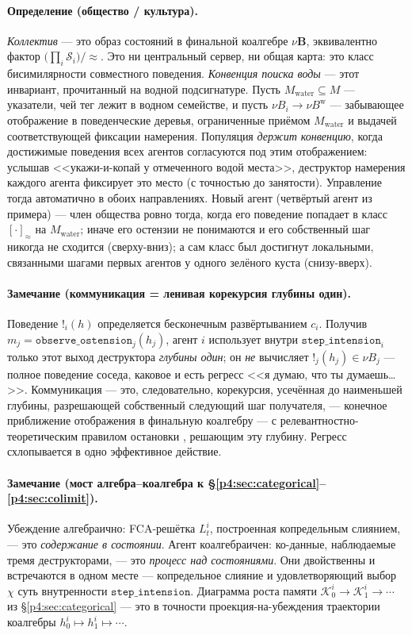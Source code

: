 \documentclass{article}
\newcommand{\method}[1]{\texttt{#1}}
\begin{document}
\paragraph{Определение (общество / культура).}
\emph{Коллектив} --- это образ состояний в финальной коалгебре
$\nu\mathbf{B}$, эквивалентно фактор
$\big(\prod_i\mathcal{S}_i\big)/\!\approx$. Это ни центральный сервер,
ни общая карта: это класс бисимилярности совместного поведения.
\emph{Конвенция поиска воды} --- этот инвариант, прочитанный на водной
подсигнатуре. Пусть $M_{\mathrm{water}}\subseteq M$ --- указатели, чей
тег лежит в водном семействе, и пусть
$\nu B_i\to\nu B^{\mathrm{w}}$ --- забывающее отображение в
поведенческие деревья, ограниченные приёмом $M_{\mathrm{water}}$ и
выдачей соответствующей фиксации намерения. Популяция \emph{держит
конвенцию}, когда достижимые поведения всех агентов согласуются под
этим отображением: услышав <<укажи-и-копай у отмеченного водой места>>,
деструктор намерения каждого агента фиксирует это место (с точностью до
занятости). Управление тогда автоматично в обоих направлениях. Новый
агент (четвёртый агент из примера) --- член общества ровно тогда, когда
его поведение попадает в класс $[\cdot]_{\approx}$ на
$M_{\mathrm{water}}$; иначе его остензии не понимаются и его собственный
шаг никогда не сходится (сверху-вниз); а сам класс был достигнут
локальными, связанными шагами первых агентов у одного зелёного куста
(снизу-вверх).

\paragraph{Замечание (коммуникация = ленивая корекурсия глубины один).}
Поведение $!_i(h)$ определяется бесконечным развёртыванием $c_i$.
Получив $m_j=\method{observe\_ostension}_j(h_j)$, агент $i$ использует
внутри $\method{step\_intension}_i$ только этот выход деструктора
\emph{глубины один}; он \emph{не} вычисляет $!_j(h_j)\in\nu B_j$ ---
полное поведение соседа, каковое и есть регресс <<я думаю, что ты
думаешь\ldots>>. Коммуникация --- это, следовательно, корекурсия,
усечённая до наименьшей глубины, разрешающей собственный следующий шаг
получателя, --- конечное приближение отображения в финальную коалгебру
--- с релевантностно-теоретическим правилом остановки
\citep{sperber1995relevance}, решающим эту глубину. Регресс схлопывается
в одно эффективное действие.

\paragraph{Замечание (мост алгебра--коалгебра к \S\ref{p4:sec:categorical}--\ref{p4:sec:colimit}).}
Убеждение алгебраично: FCA-решётка $L_t^i$, построенная копредельным
слиянием, --- это \emph{содержание в состоянии}. Агент коалгебраичен:
ко-данные, наблюдаемые тремя деструкторами, --- это \emph{процесс над
состояниями}. Они двойственны и встречаются в одном месте ---
копредельное слияние и удовлетворяющий выбор $\chi$ суть внутренности
$\method{step\_intension}$. Диаграмма роста памяти
$\mathcal{K}_0^i\to\mathcal{K}_1^i\to\cdots$ из \S\ref{p4:sec:categorical}
--- это в точности проекция-на-убеждения траектории коалгебры
$h_0^i\mapsto h_1^i\mapsto\cdots$.
\end{document}
